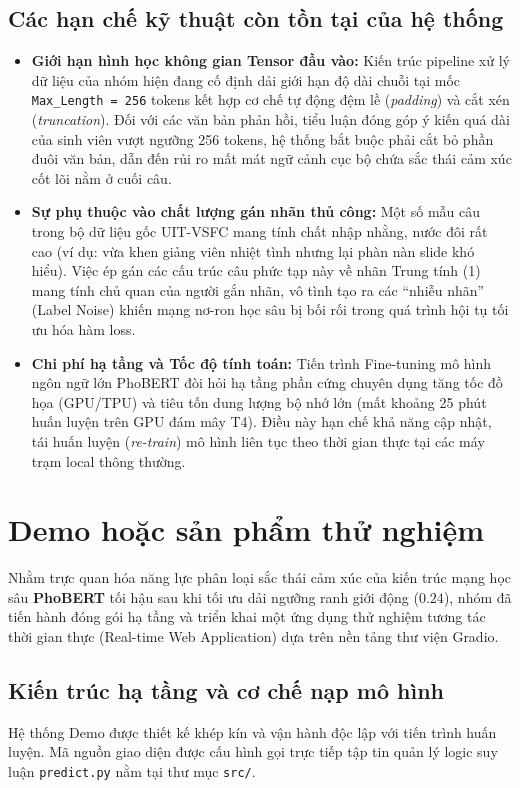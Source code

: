 \documentclass[conference,10pt,a4paper]{IEEEtran}
\begin{document}
\subsection{Các hạn chế kỹ thuật còn tồn tại của hệ thống}
\begin{itemize}
    \item \textbf{Giới hạn hình học không gian Tensor đầu vào:} Kiến trúc pipeline xử lý dữ liệu của nhóm hiện đang cố định dải giới hạn độ dài chuỗi tại mốc \texttt{Max\_Length = 256} tokens kết hợp cơ chế tự động đệm lề (\textit{padding}) và cắt xén (\textit{truncation}). Đối với các văn bản phản hồi, tiểu luận đóng góp ý kiến quá dài của sinh viên vượt ngưỡng 256 tokens, hệ thống bắt buộc phải cắt bỏ phần đuôi văn bản, dẫn đến rủi ro mất mát ngữ cảnh cục bộ chứa sắc thái cảm xúc cốt lõi nằm ở cuối câu.
    
    \item \textbf{Sự phụ thuộc vào chất lượng gán nhãn thủ công:} Một số mẫu câu trong bộ dữ liệu gốc UIT-VSFC mang tính chất nhập nhằng, nước đôi rất cao (ví dụ: vừa khen giảng viên nhiệt tình nhưng lại phàn nàn slide khó hiểu). Việc ép gán các cấu trúc câu phức tạp này về nhãn Trung tính (1) mang tính chủ quan của người gắn nhãn, vô tình tạo ra các ``nhiễu nhãn'' (Label Noise) khiến mạng nơ-ron học sâu bị bối rối trong quá trình hội tụ tối ưu hóa hàm loss.
    
    \item \textbf{Chi phí hạ tầng và Tốc độ tính toán:} Tiến trình Fine-tuning mô hình ngôn ngữ lớn PhoBERT đòi hỏi hạ tầng phần cứng chuyên dụng tăng tốc đồ họa (GPU/TPU) và tiêu tốn dung lượng bộ nhớ lớn (mất khoảng 25 phút huấn luyện trên GPU đám mây T4). Điều này hạn chế khả năng cập nhật, tái huấn luyện (\textit{re-train}) mô hình liên tục theo thời gian thực tại các máy trạm local thông thường.
\end{itemize}


\section{Demo hoặc sản phẩm thử nghiệm}
Nhằm trực quan hóa năng lực phân loại sắc thái cảm xúc của kiến trúc mạng học sâu \textbf{PhoBERT} tối hậu sau khi tối ưu dải ngưỡng ranh giới động ($0.24$), nhóm đã tiến hành đóng gói hạ tầng và triển khai một ứng dụng thử nghiệm tương tác thời gian thực (Real-time Web Application) dựa trên nền tảng thư viện Gradio.

\subsection{Kiến trúc hạ tầng và cơ chế nạp mô hình}
Hệ thống Demo được thiết kế khép kín và vận hành độc lập với tiến trình huấn luyện. Mã nguồn giao diện được cấu hình gọi trực tiếp tập tin quản lý logic suy luận \texttt{predict.py} nằm tại thư mục \texttt{src/}.
\end{document}
